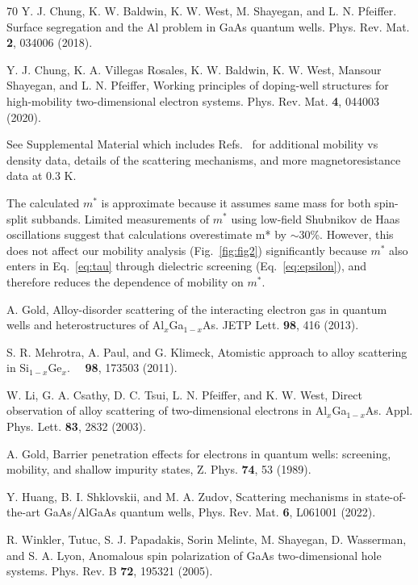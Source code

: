 \documentclass[reprint,amsmath,amssymb,aps,prl,nobibnotes,superscriptaddress]{revtex4-1}
\begin{document}
\begin{thebibliography}{70}
 Y. J. Chung, K. W. Baldwin, K. W. West, M. Shayegan, and L. N. Pfeiffer. Surface segregation and the Al problem in GaAs quantum wells. Phys. Rev. Mat. \textbf{2}, 034006 (2018).

 Y. J. Chung, K. A. Villegas Rosales, K. W. Baldwin, K. W. West, Mansour Shayegan, and L. N. Pfeiffer, Working principles of doping-well structures for high-mobility two-dimensional electron systems. Phys. Rev. Mat. \textbf{4}, 044003 (2020).

 See Supplemental Material which includes Refs.~\cite{Chung2018, Gold2013,Mehrotra2011,Li2003} for additional mobility vs density data, details of the scattering mechanisms, and more magnetoresistance data at 0.3 K. 

The calculated $m^*$ is approximate because it assumes same mass for both spin-split subbands. Limited measurements of $m^*$ using low-field Shubnikov de Haas oscillations suggest that calculations overestimate m* by $\sim$30\%. However, this does not affect our mobility analysis (Fig.~\ref{fig:fig2}) significantly because $m^*$ also enters in Eq.~\ref{eq:tau} through dielectric screening (Eq.~\ref{eq:epsilon}), and therefore reduces the dependence of mobility on $m^*$.

A. Gold, Alloy-disorder scattering of the interacting electron gas in quantum wells and heterostructures of Al$_x$Ga$_{1-x}$As. JETP Lett. \textbf{98}, 416 (2013).

 S. R. Mehrotra, A. Paul, and G. Klimeck, Atomistic approach to alloy scattering in Si$_{1-x}$Ge$_x$. \apl\ \ \textbf{98}, 173503 (2011).

 W. Li, G. A. Csathy, D. C. Tsui, L. N. Pfeiffer, and K. W. West, Direct observation of alloy scattering of two-dimensional electrons in Al$_x$Ga$_{1-x}$As. Appl. Phys. Lett. \textbf{83}, 2832 (2003).

 A. Gold, Barrier penetration effects for electrons in quantum wells: screening, mobility, and shallow impurity states, Z. Phys. \textbf{74}, 53 (1989).

 Y. Huang, B. I. Shklovskii, and M. A. Zudov, Scattering mechanisms in state-of-the-art GaAs/AlGaAs quantum wells, Phys. Rev. Mat. \textbf{6}, L061001 (2022).

 R. Winkler, Tutuc, S. J. Papadakis, Sorin Melinte, M. Shayegan, D. Wasserman, and S. A. Lyon, Anomalous spin polarization of GaAs two-dimensional hole systems. Phys. Rev. B \textbf{72}, 195321 (2005).



\end{thebibliography}
\end{document}
